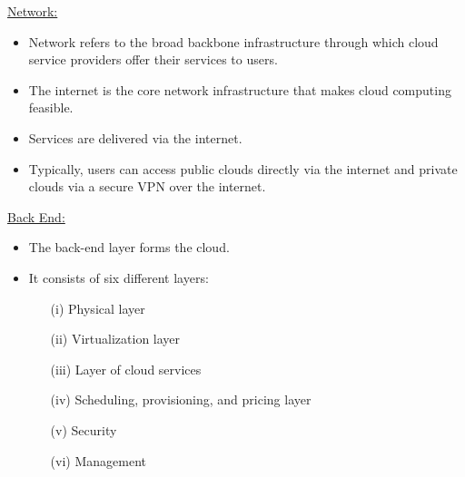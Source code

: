 \documentclass[a4paper, 12pt]{article}
\begin{document}
\underline{Network:}
\begin{itemize}
\item
Network refers to the broad backbone infrastructure through which cloud service providers offer their services to users.
\item
The internet is the core network infrastructure that makes cloud computing feasible.
\item
Services are delivered via the internet.
\item
Typically, users can access public clouds directly via the internet and private clouds via a secure VPN over the internet.
\end{itemize}

\underline{Back End:}
\begin{itemize}
\item
The back-end layer forms the cloud.
\item
It consists of six different layers:
\begin{itemize}
\item[(i)]
Physical layer
\item[(ii)]
Virtualization layer
\item[(iii)]
Layer of cloud services
\item[(iv)]
Scheduling, provisioning, and pricing layer
\item[(v)]
Security
\item[(vi)]
Management
\end{itemize}
\end{itemize}
\end{document}
